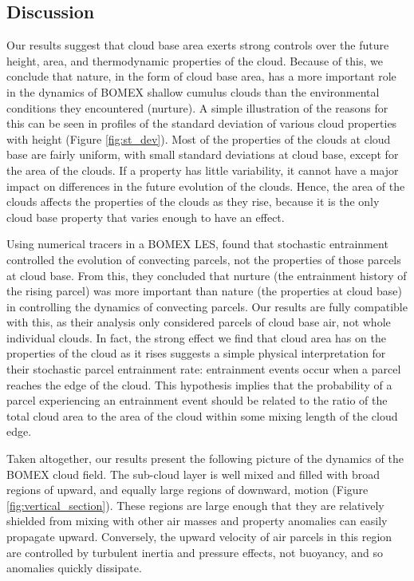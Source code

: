 \documentclass[acp]{copernicus}
\begin{document}
\subsection{Discussion}

Our results suggest that cloud base area exerts strong controls over the 
future height, area, and thermodynamic properties of the cloud.  Because of 
this, we conclude that nature, in the form of cloud base area, has a more 
important role in the dynamics of BOMEX shallow cumulus clouds than the 
environmental conditions they encountered (nurture).  A simple illustration of 
the reasons for this can be seen in profiles of the standard deviation of 
various cloud properties with height (Figure \ref{fig:st_dev}).  Most of the 
properties of the clouds at cloud base are fairly uniform, with small standard 
deviations at cloud base, except for the area of the clouds.  If a property has 
little variability, it cannot have a major impact on differences in the future 
evolution of the clouds.  Hence, the area of the clouds affects the properties 
of the clouds as they rise, because it is the only cloud base property that 
varies enough to have an effect.

Using numerical tracers in a BOMEX LES, \cite{Romps2010a} found that 
stochastic entrainment controlled the evolution of convecting parcels, not 
the properties of those parcels at cloud base.  From this, they concluded that 
nurture (the entrainment history of the rising parcel) was more important than 
nature (the properties at cloud base) in controlling the dynamics of convecting 
parcels.  Our results are fully compatible with this, as their analysis only 
considered parcels of cloud base air, not whole individual clouds.  In fact, 
the strong effect we find that cloud area has on the properties of the cloud as 
it rises suggests a simple physical interpretation for their stochastic parcel 
entrainment rate: entrainment events occur when a parcel reaches the edge of 
the cloud.  This hypothesis implies that the probability of a parcel 
experiencing an entrainment event should be related to the ratio of the total 
cloud area to the area of the cloud within some mixing length of the cloud 
edge.

Taken altogether, our results present the following picture of the dynamics of 
the BOMEX cloud field.  The sub-cloud layer is well mixed and filled with 
broad regions of upward, and equally large regions of downward, motion (Figure 
\ref{fig:vertical_section}).  These regions are large enough that they are 
relatively shielded from mixing with other air masses and property anomalies 
can easily propagate upward.  Conversely, the upward velocity of air parcels in 
this region are controlled by turbulent inertia and pressure effects, not 
buoyancy, and so anomalies quickly dissipate.
\end{document}
